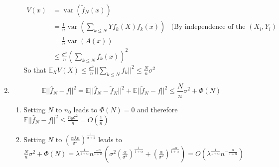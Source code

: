 \documentclass[12pt]{article}
\DeclareMathOperator{\var}{var}
\begin{document}
\begin{enumerate}
\begin{enumerate}
    \begin{align*}
      V(x) &= \var(\tilde f_N(x))
      \\&= \frac1 n \var\left( \sum_{k \le N} Y f_k(X)f_k(x)\right) & \text{(By independence of the $(X_i, Y_i)$} 
      \\&= \frac1 n \var(A(x))
      \\&\le \frac{\sigma^2} n (\sum_{k \le N} f_k(x))^2
    \end{align*}        
    So that $\mathbb E_X V(X)  \le \frac{\sigma^2}{n} ||\sum_{k \le N} f_k||^2 \le \frac N n \sigma^2$
  \end{enumerate}
\item
  $$\mathbb E ||\hat f_N - f ||^2 = \mathbb E ||\hat f_N - \tilde f_N||^2 + \mathbb E ||\tilde f_N - f|| ^2 \le \frac Nn \sigma^2 + \Phi(N)$$
  \begin{enumerate}
  \item Setting $N$ to $n_0$ leads to $\Phi(N) = 0$ and therefore
    $\mathbb E ||\hat f_N - f ||^2 \le \frac{n_0 \sigma^2} {n} = O(\frac 1 n)$
  \item Setting $N$ to $(\frac{\alpha \lambda n}{\sigma^2})^{\frac 1{\alpha+1}}$ leads to
    $\frac N n \sigma^2 + \Phi(N) =
    \lambda^{\frac1 {1+\alpha}} n^{\frac{-\alpha} {1+\alpha}}
    \left(\sigma^2 (\frac{\alpha}{\sigma^2})^{\frac1 {1+\alpha}} 
      + (\frac{\alpha}{\sigma^2})^{\frac{-\alpha} {1+\alpha}}
      \right)
    = O(\lambda^{\frac1 {1+\alpha}} n^{-\frac \alpha {1+\alpha}}) $
  \end{enumerate}
  
\end{enumerate}
\end{document}
